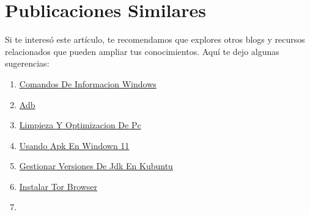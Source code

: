 \documentclass[
  doc,
  floatsintext,
  longtable,
  a4paper,
  nolmodern,
  notxfonts,
  notimes,
  colorlinks=true,linkcolor=blue,citecolor=blue,urlcolor=blue]{apa7}
\providecommand{\tightlist}{%
  \setlength{\itemsep}{0pt}\setlength{\parskip}{0pt}}
\begin{document}
\section{Publicaciones Similares}\label{publicaciones-similares}

Si te interesó este artículo, te recomendamos que explores otros blogs y
recursos relacionados que pueden ampliar tus conocimientos. Aquí te dejo
algunas sugerencias:

\begin{enumerate}
\def\labelenumi{\arabic{enumi}.}
\tightlist
\item
  \href{https://achalmaedison.netlify.app/tecnologia-seguridad/operating-system/2017-05-21-comandos-de-informacion-windows/index.pdf}{}
  \href{https://achalmaedison.netlify.app/tecnologia-seguridad/operating-system/2017-05-21-comandos-de-informacion-windows}{Comandos
  De Informacion Windows}
\item
  \href{https://achalmaedison.netlify.app/tecnologia-seguridad/operating-system/2019-06-19-adb/index.pdf}{}
  \href{https://achalmaedison.netlify.app/tecnologia-seguridad/operating-system/2019-06-19-adb}{Adb}
\item
  \href{https://achalmaedison.netlify.app/tecnologia-seguridad/operating-system/2021-08-17-limpieza-y-optimizacion-de-pc/index.pdf}{}
  \href{https://achalmaedison.netlify.app/tecnologia-seguridad/operating-system/2021-08-17-limpieza-y-optimizacion-de-pc}{Limpieza
  Y Optimizacion De Pc}
\item
  \href{https://achalmaedison.netlify.app/tecnologia-seguridad/operating-system/2021-10-21-usando-apk-en-windown-11/index.pdf}{}
  \href{https://achalmaedison.netlify.app/tecnologia-seguridad/operating-system/2021-10-21-usando-apk-en-windown-11}{Usando
  Apk En Windown 11}
\item
  \href{https://achalmaedison.netlify.app/tecnologia-seguridad/operating-system/2022-05-12-gestionar-versiones-de-jdk-en-kubuntu/index.pdf}{}
  \href{https://achalmaedison.netlify.app/tecnologia-seguridad/operating-system/2022-05-12-gestionar-versiones-de-jdk-en-kubuntu}{Gestionar
  Versiones De Jdk En Kubuntu}
\item
  \href{https://achalmaedison.netlify.app/tecnologia-seguridad/operating-system/2022-07-21-instalar-tor-browser/index.pdf}{}
  \href{https://achalmaedison.netlify.app/tecnologia-seguridad/operating-system/2022-07-21-instalar-tor-browser}{Instalar
  Tor Browser}
\item

\end{enumerate}
\end{document}

